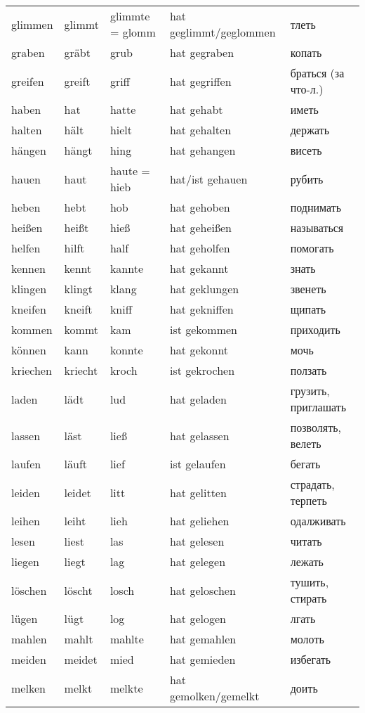 \begin{longtable}{|l|l|l|l|l|}
glimmen & glimmt & glimmte = glomm & hat geglimmt/geglommen & тлеть \\
graben & gr\"abt & grub & hat gegraben & копать \\
greifen & greift & griff & hat gegriffen & браться (за что-л.) \\
haben & hat & hatte & hat gehabt & иметь \\
halten & h\"alt & hielt & hat gehalten & держать \\
h\"angen & h\"angt & hing & hat gehangen & висеть \\
hauen & haut & haute = hieb & hat/ist gehauen & рубить \\
heben & hebt & hob & hat gehoben & поднимать \\
hei\ss en & hei\ss t & hie\ss  & hat gehei\ss en & называться \\
helfen & hilft & half & hat geholfen & помогать \\
kennen & kennt & kannte & hat gekannt & знать \\
klingen & klingt & klang & hat geklungen & звенеть \\
kneifen & kneift & kniff & hat gekniffen & щипать \\
kommen & kommt & kam & ist gekommen & приходить \\
k\"onnen & kann & konnte & hat gekonnt & мочь \\
kriechen & kriecht & kroch & ist gekrochen & ползать \\
laden & l\"adt & lud & hat geladen & грузить, приглашать \\
lassen & l\"ast & lie\ss  & hat gelassen & позволять, велеть \\
laufen & l\"auft & lief & ist gelaufen & бегать \\
leiden & leidet & litt & hat gelitten & страдать, терпеть \\
leihen & leiht & lieh & hat geliehen & одалживать \\
lesen & liest & las & hat gelesen & читать \\
liegen & liegt & lag & hat gelegen & лежать \\
l\"oschen & l\"oscht & losch & hat geloschen & тушить, стирать \\
l\"ugen & l\"ugt & log & hat gelogen & лгать \\
mahlen & mahlt & mahlte & hat gemahlen & молоть \\
meiden & meidet & mied & hat gemieden & избегать \\
melken & melkt & melkte & hat gemolken/gemelkt & доить \\

\end{longtable}
